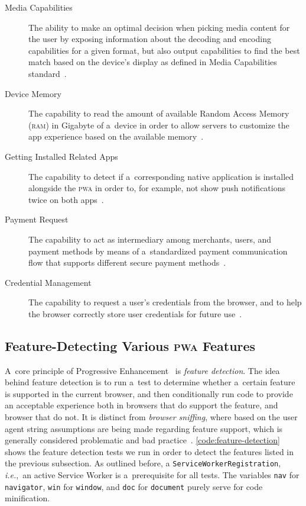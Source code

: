 \documentclass[sigconf]{acmart}
\begin{document}
\begin{description}
  \item[Media Capabilities] The ability to make an optimal decision
    when picking media content for the user by exposing information
    about the decoding and encoding capabilities for a given format,
    but also output capabilities to find the best match based on the device's display
    as defined in Media Capabilities standard~\cite{lamouri2017mediacapabilities}.
  \item[Device Memory] The capability to read the amount of available
    Random Access Memory (\textsc{ram}) in Gigabyte
    of a~device in order to allow servers to customize the app experience
    based on the available memory~\cite{panicker2017devicememory}.
  \item[Getting Installed Related Apps] The capability to detect if a~corresponding
    native application is installed alongside the \textsc{pwa} in order to,
    for example, not show push notifications twice on both apps~\cite{kinlan2017relatedapps}.
  \item[Payment Request] The capability to act as intermediary among merchants,
    users, and payment methods by means of a~standardized payment communication flow
    that supports different secure payment methods~\cite{bateman2017paymentrequest}.
  \item[Credential Management] The capability to request a user's credentials
    from the browser, and to help the browser correctly store user credentials
    for future use~\cite{west2017credentialmanagement}.
\end{description} 

\subsection{Feature-Detecting Various \textsc{pwa} Features}

A~core principle of Progressive Enhancement~\cite{champeon2003progressiveenhancement}
is \emph{feature detection}.
The idea behind feature detection is to run a~test to determine
whether a~certain feature is supported in the current browser,
and then conditionally run code to provide an acceptable experience
both in browsers that do support the feature, and browser that do not.
It is distinct from \emph{browser sniffing}, where based on the user agent string
assumptions are being made regarding feature support,
which is generally considered problematic and bad practice~\cite{andersen2008useragent}.
\autoref{code:feature-detection} shows the feature detection tests
we run in order to detect the features listed in the previous subsection.
As outlined before, a \texttt{ServiceWorkerRegistration},
\emph{i.e.},\ an active Service Worker is a~prerequisite for all tests.  
The variables \texttt{nav} for \texttt{navigator},
\texttt{win} for \texttt{window}, and \texttt{doc} for \texttt{document}
purely serve for code minification.
\end{document}
